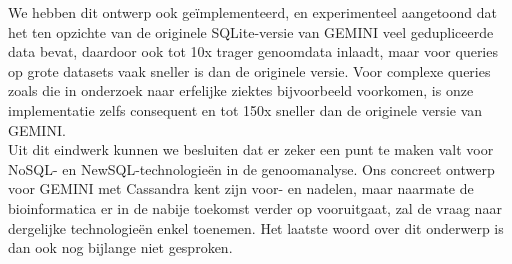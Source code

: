 We hebben dit ontwerp ook ge\"implementeerd, en experimenteel aangetoond dat het ten opzichte van de originele SQLite-versie van GEMINI veel gedupliceerde data bevat, daardoor ook tot 10x trager genoomdata inlaadt, maar voor queries op grote datasets vaak sneller is dan de originele versie. Voor complexe queries zoals die in onderzoek naar erfelijke ziektes bijvoorbeeld voorkomen, is onze implementatie zelfs consequent en tot 150x sneller dan de originele versie van GEMINI.\\
Uit dit eindwerk kunnen we besluiten dat er zeker een punt te maken valt voor NoSQL- en NewSQL-technologie\"en in de genoomanalyse. Ons concreet ontwerp voor GEMINI met Cassandra kent zijn voor- en nadelen, maar naarmate de bioinformatica er in de nabije toekomst verder op vooruitgaat, zal de vraag naar dergelijke technologie\"en enkel toenemen. Het laatste woord over dit onderwerp is dan ook nog bijlange niet gesproken.